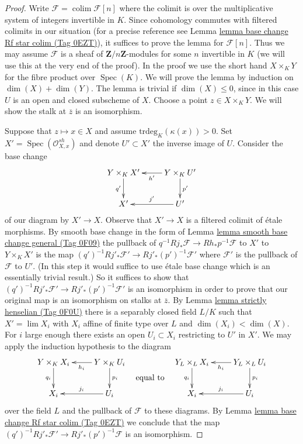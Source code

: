 \documentclass{amsart}
\theoremstyle{plain}
\theoremstyle{definition}
\theoremstyle{remark}
\numberwithin{equation}{subsection}
\def\lim{\mathop{\mathrm{lim}}\nolimits}
\def\colim{\mathop{\mathrm{colim}}\nolimits}
\def\Spec{\mathop{\mathrm{Spec}}}
\begin{document}
\begin{proof}
Write $\mathcal{F} = \colim \mathcal{F}[n]$ where the colimit
is over the multiplicative system of integers invertible in $K$.
Since cohomology commutes with filtered colimits in our situation
(for a precise reference see Lemma \href{https://stacks.math.columbia.edu/tag/0EZT}{lemma base change Rf star colim (Tag 0EZT)}),
it suffices to prove the lemma for $\mathcal{F}[n]$. Thus we may
assume $\mathcal{F}$ is a sheaf of $\mathbf{Z}/n\mathbf{Z}$-modules
for some $n$ invertible in $K$ (we will use this at the very end of
the proof). In the proof we use the short hand $X \times_K Y$ for the fibre
product over $\Spec(K)$.
We will prove the lemma by induction on $\dim(X) + \dim(Y)$.
The lemma is trivial if $\dim(X) \leq 0$, since in this case
$U$ is an open and closed subscheme of $X$.
Choose a point $z \in X \times_K Y$. We will show
the stalk at $\overline{z}$ is an isomorphism.

\medskip\noindent
Suppose that $z \mapsto x \in X$ and assume $\text{trdeg}_K(\kappa(x)) > 0$.
Set $X' = \Spec(\mathcal{O}_{X, x}^{sh})$
and denote $U' \subset X'$ the inverse image of $U$.
Consider the base change
$$
\xymatrix{
Y \times_K X' \ar[d]_{q'}  &
Y \times_K U' \ar[l]^{h'} \ar[d]^{p'} \\
X' & U' \ar[l]_{j'}
}
$$
of our diagram by $X' \to X$. Observe that $X' \to X$ is a filtered
colimit of \'etale morphisms. By smooth base change in the form of
Lemma \href{https://stacks.math.columbia.edu/tag/0F09}{lemma smooth base change general (Tag 0F09)} the pullback of
$q^{-1}Rj_*\mathcal{F} \to Rh_*p^{-1}\mathcal{F}$ to $X'$ to
$Y \times_K X'$ is the map
$(q')^{-1}Rj'_*\mathcal{F}' \to Rj'_*(p')^{-1}\mathcal{F}'$ where
$\mathcal{F}'$ is the pullback of $\mathcal{F}$ to $U'$.
(In this step it would suffice to use \'etale base change which is
an essentially trivial result.) So it suffices to show
that $(q')^{-1}Rj'_*\mathcal{F}' \to Rj'_*(p')^{-1}\mathcal{F}'$
is an isomorphism in order to prove that our original
map is an isomorphism on stalks at $\overline{z}$.
By Lemma \href{https://stacks.math.columbia.edu/tag/0F0U}{lemma strictly henselian (Tag 0F0U)}
there is a separably closed field $L/K$ such that
$X' = \lim X_i$ with $X_i$ affine of finite type over $L$
and $\dim(X_i) < \dim(X)$. For $i$ large enough there
exists an open $U_i \subset X_i$ restricting to $U'$ in $X'$.
We may apply the induction hypothesis to the diagram
$$
\vcenter{
\xymatrix{
Y \times_K X_i \ar[d]_{q_i}  &
Y \times_K U_i \ar[l]^{h_i} \ar[d]^{p_i} \\
X_i & U_i \ar[l]_{j_i}
}
}
\quad\text{equal to}\quad
\vcenter{
\xymatrix{
Y_L \times_L X_i \ar[d]_{q_i}  &
Y_L \times_L U_i \ar[l]^{h_i} \ar[d]^{p_i} \\
X_i & U_i \ar[l]_{j_i}
}
}
$$
over the field $L$ and the pullback of $\mathcal{F}$ to these diagrams.
By Lemma \href{https://stacks.math.columbia.edu/tag/0EZT}{lemma base change Rf star colim (Tag 0EZT)} we conclude that the map
$(q')^{-1}Rj'_*\mathcal{F}' \to Rj'_*(p')^{-1}\mathcal{F}$ is an isomorphism.


\end{proof}
\end{document}
